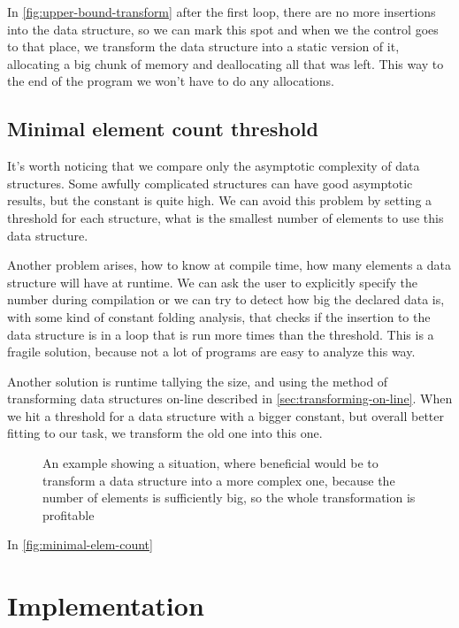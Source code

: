 \documentclass[a4paper,11pt]{article}
\begin{document}
		In \autoref{fig:upper-bound-transform} after the first loop, there are no more insertions into the data
		structure, so we can mark this spot and when we the control goes to that place, we transform the data
		structure into a static version of it, allocating a big chunk of memory and deallocating all that was
		left. This way to the end of the program we won't have to do any allocations.

	\subsection{Minimal element count threshold}

		It's worth noticing that we compare only the asymptotic complexity of data structures. Some awfully
		complicated structures can have good asymptotic results, but the constant is quite high. We can avoid
		this problem by setting a threshold for each structure, what is the smallest number of elements to use
		this data structure.

		Another problem arises, how to know at compile time, how many elements a data structure will have at
		runtime. We can ask the user to explicitly specify the number during compilation or we can try to
		detect how big the declared data is, with some kind of constant folding analysis, that checks if the
		insertion to the data structure is in a loop that is run more times than the threshold. This is a fragile
		solution, because not a lot of programs are easy to analyze this way.

		Another solution is runtime tallying the size, and using the method of transforming data structures
		on-line described in \autoref{sec:transforming-on-line}. When we hit a threshold for a data structure
		with a bigger constant, but overall better fitting to our task, we transform the old one into this one.

		\begin{figure}
			

			\caption{An example showing a situation, where beneficial would be to transform a data structure
				into a more complex one, because the number of elements is sufficiently big, so the
				whole transformation is profitable}

			\label{fig:minimal-elem-count}
		\end{figure}

		In \autoref{fig:minimal-elem-count} 

\section{Implementation}
\end{document}
